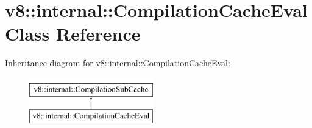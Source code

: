 \hypertarget{classv8_1_1internal_1_1CompilationCacheEval}{}\section{v8\+:\+:internal\+:\+:Compilation\+Cache\+Eval Class Reference}
\label{classv8_1_1internal_1_1CompilationCacheEval}
Inheritance diagram for v8\+:\+:internal\+:\+:Compilation\+Cache\+Eval\+:\begin{figure}[H]
\begin{center}
\leavevmode
\includegraphics[height=2.000000cm]{classv8_1_1internal_1_1CompilationCacheEval}
\end{center}
\end{figure}
